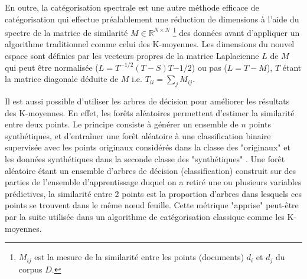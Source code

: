 En outre, la catégorisation spectrale est une autre méthode efficace de catégorisation qui effectue préalablement une réduction de dimensions à l'aide du spectre de la matrice de similarité $M \in \mathbb{R}^{N \times N}$ \footnote{$M_{ij}$ est la mesure de la similarité entre les points (documents) $d_i$ et $d_j$ du corpus $D$.} des données  avant d'appliquer un algorithme traditionnel comme celui des K-moyennes. Les dimensions du nouvel espace sont définies par les vecteurs propres de la matrice Laplacienne $L$ de $M$ \citep{shi2000spectralClustering, von2007tutorialSpectralClustering} qui peut être normalisée ($L = T^{-1/2}(T-S)T{-1/2}$) ou pas ($L = T - M$), $T$ étant la matrice diagonale déduite de $M$ i.e. $T_{ii} = \sum\limits_j M_{ij}$. 

Il est aussi possible d'utiliser les arbres de décision pour améliorer les résultats des K-moyennes. En effet, les forêts aléatoires \citep{breiman2001randomforest} permettent d'estimer la similarité entre deux points. Le principe consiste à générer un ensemble de $n$ points synthétiques, et d'entraîner une forêt aléatoire à une classification binaire supervisée avec les points originaux considérés dans la classe des "originaux" et les données synthétiques dans la seconde classe des "synthétiques" \citep{afanador2016unsupervisedrandomforest}. Une forêt aléatoire étant un ensemble d'arbres de décision (classification) construit sur des parties de l'ensemble d'apprentissage duquel on a retiré une ou plusieurs variables prédictives, la similarité entre 2 points est la proportion d'arbres dans lesquels ces points se trouvent dans le même nœud feuille. Cette métrique "apprise" peut-être par la suite utilisée dans un algorithme de catégorisation classique comme les K-moyennes.


